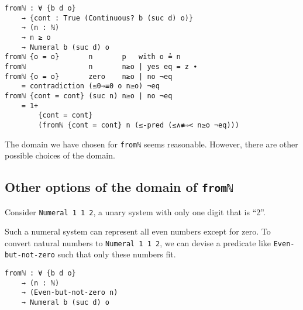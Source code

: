 \documentclass[\main/thesis.tex]{subfiles}
\begin{document}
\begin{lstlisting}
fromℕ : ∀ {b d o}
    → {cont : True (Continuous? b (suc d) o)}
    → (n : ℕ)
    → n ≥ o
    → Numeral b (suc d) o
fromℕ {o = o}       n       p   with o ≟ n
fromℕ               n       n≥o | yes eq = z ∙
fromℕ {o = o}       zero    n≥o | no ¬eq
    = contradiction (≤0⇒≡0 o n≥o) ¬eq
fromℕ {cont = cont} (suc n) n≥o | no ¬eq
    = 1+
        {cont = cont}
        (fromℕ {cont = cont} n (≤-pred (≤∧≢⇒< n≥o ¬eq)))
\end{lstlisting}

The domain we have chosen for \lstinline|fromℕ| seems reasonable.
However, there are other possible choices of the domain.

\subsection{Other options of the domain of \lstinline|fromℕ|}

Consider \lstinline|Numeral 1 1 2|, a unary system with only one digit
that is ``2''.

\begin{center}
    \begin{adjustbox}{max width=\textwidth}
    \end{adjustbox}
\end{center}

Such a numeral system can represent all even numbers except for zero.
To convert natural numbers to \lstinline|Numeral 1 1 2|, we can devise a
predicate like \lstinline|Even-but-not-zero| such that only these numbers fit.

\begin{lstlisting}
fromℕ : ∀ {b d o}
    → (n : ℕ)
    → (Even-but-not-zero n)
    → Numeral b (suc d) o
\end{lstlisting}
\end{document}

